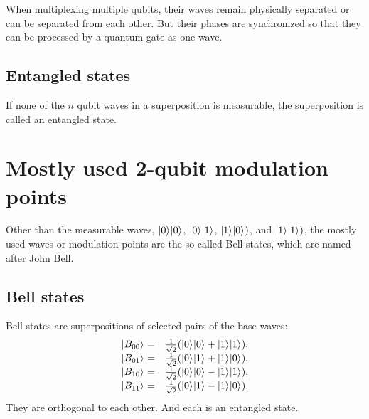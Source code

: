 \documentclass[oneside, letter, 12pt]{book}
\begin{document}
When multiplexing multiple qubits, their waves remain physically separated or can be separated from each other. But their phases are synchronized so that they can be processed by a quantum gate as one wave.

\subsection{Entangled states}
If none of the $n$ qubit waves in a superposition is measurable, the superposition is called an entangled state.

\section{Mostly used 2-qubit modulation points}
Other than the measurable waves, $\vert {0} \rangle_{}\vert {0} \rangle_{}$, $\vert {0} \rangle_{}\vert {1} \rangle_{}$, $\vert {1} \rangle_{}\vert {0} \rangle_{})$, and $\vert {1} \rangle_{}\vert {1} \rangle_{})$, the mostly used waves or modulation points are the so called Bell states, which are named after John Bell. 

\subsection{Bell states}
Bell states are superpositions of selected pairs of the base waves:
\begin{equation}
\begin{array}{rl}
    \vert {B_{00}} \rangle_{} =& \frac 1 {\sqrt 2} (\vert {0} \rangle_{}\vert {0} \rangle_{}+\vert {1} \rangle_{}\vert {1} \rangle_{}),\\
    \vert {B_{01}} \rangle_{} =& \frac 1 {\sqrt 2} (\vert {0} \rangle_{}\vert {1} \rangle_{}+\vert {1} \rangle_{}\vert {0} \rangle_{}),\\
    \vert {B_{10}} \rangle_{} =& \frac 1 {\sqrt 2} (\vert {0} \rangle_{}\vert {0} \rangle_{}-\vert {1} \rangle_{}\vert {1} \rangle_{}),\\
    \vert {B_{11}} \rangle_{} =& \frac 1 {\sqrt 2} (\vert {0} \rangle_{}\vert {1} \rangle_{}-\vert {1} \rangle_{}\vert {0} \rangle_{}).
\end{array}
\end{equation}
They are orthogonal to each other. And each is an entangled state.
\end{document}
